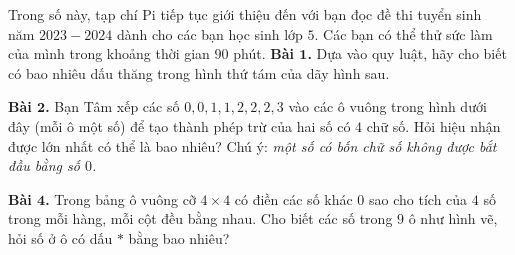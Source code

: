 \begin{multicols}{2}
	Trong số này, tạp chí Pi tiếp tục giới thiệu đến với bạn đọc đề thi tuyển sinh năm $2023-2024$ dành cho các bạn học sinh lớp $5$. Các bạn có thể thử sức làm của mình trong khoảng thời gian $90$ phút.
	\vskip 0.1cm
	\textbf{Bài $\pmb1$.} 
	Dựa vào quy luật, hãy cho biết có bao nhiêu dấu thăng trong hình thứ tám của dãy hình sau.
	
%		
	\textbf{Bài $\pmb2$.} Bạn Tâm xếp các số $0, 0, 1, 1, 2, 2, 2, 3$ vào các ô vuông trong hình dưới đây (mỗi ô một số) để tạo thành phép trừ của hai số có $4$ chữ số. Hỏi hiệu nhận được lớn nhất có thể là bao nhiêu? 
	\vskip 0.1cm
	Chú ý: \textit{một số có bốn chữ số không được bắt đầu bằng số $0$.}
	\begin{figure}[H]
		\vspace*{-5pt}
		\centering
		\captionsetup{labelformat= empty, justification=centering}
		\vspace*{-10pt}
	\end{figure}
%		
	\textbf{Bài $\pmb4$.} Trong bảng ô vuông cỡ $4\times 4$ có điền các số khác $0$ sao cho tích của $4$ số trong mỗi hàng, mỗi cột đều bằng nhau. Cho biết các số trong $9$ ô như hình vẽ, hỏi số ở ô có dấu $*$ bằng bao nhiêu?
	\begin{figure}[H]
		\vspace*{-5pt}
		\centering
		\captionsetup{labelformat= empty, justification=centering}
\end{figure}
\end{multicols}
